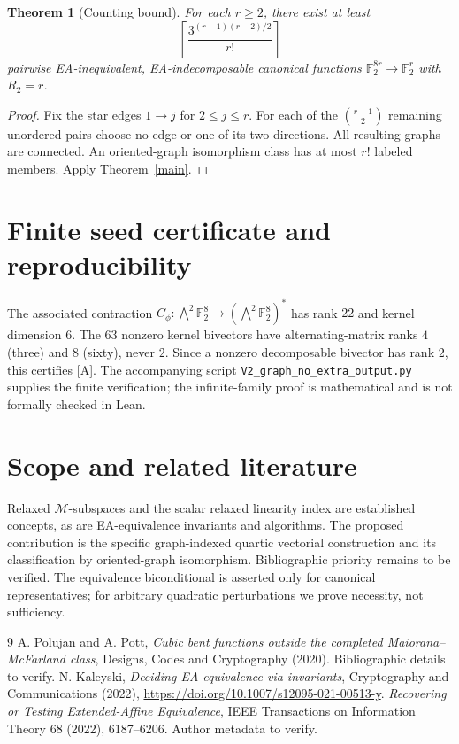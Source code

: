 \documentclass[11pt]{article}
\newtheorem{theorem}{Theorem}
\newcommand{\F}{\mathbb F}
\begin{document}
\begin{theorem}[Counting bound]
For each $r\ge2$, there exist at least
\[
\left\lceil\frac{3^{(r-1)(r-2)/2}}{r!}\right\rceil
\]
pairwise EA-inequivalent, EA-indecomposable canonical functions $\F_2^{8r}\to\F_2^r$ with $R_2=r$.
\end{theorem}
\begin{proof}
Fix the star edges $1\to j$ for $2\le j\le r$. For each of the $\binom{r-1}{2}$ remaining unordered pairs choose no edge or one of its two directions. All resulting graphs are connected. An oriented-graph isomorphism class has at most $r!$ labeled members. Apply Theorem~\ref{main}.
\end{proof}
\section{Finite seed certificate and reproducibility}
The associated contraction $C_\phi:\bigwedge^2\F_2^8\to(\bigwedge^2\F_2^8)^*$ has rank $22$ and kernel dimension $6$. The $63$ nonzero kernel bivectors have alternating-matrix ranks $4$ (three) and $8$ (sixty), never $2$. Since a nonzero decomposable bivector has rank $2$, this certifies \eqref{A}. The accompanying script \texttt{V2\_graph\_no\_extra\_output.py} supplies the finite verification; the infinite-family proof is mathematical and is not formally checked in Lean.
\section{Scope and related literature}
Relaxed $\mathcal M$-subspaces and the scalar relaxed linearity index are established concepts, as are EA-equivalence invariants and algorithms. The proposed contribution is the specific graph-indexed quartic vectorial construction and its classification by oriented-graph isomorphism. Bibliographic priority remains to be verified. The equivalence biconditional is asserted only for canonical representatives; for arbitrary quadratic perturbations we prove necessity, not sufficiency.
\begin{thebibliography}{9}
 A. Polujan and A. Pott, \emph{Cubic bent functions outside the completed Maiorana--McFarland class}, Designs, Codes and Cryptography (2020). Bibliographic details to verify.
 N. Kaleyski, \emph{Deciding EA-equivalence via invariants}, Cryptography and Communications (2022), \url{https://doi.org/10.1007/s12095-021-00513-y}.
 \emph{Recovering or Testing Extended-Affine Equivalence}, IEEE Transactions on Information Theory 68 (2022), 6187--6206. Author metadata to verify.
\end{thebibliography}
\end{document}
